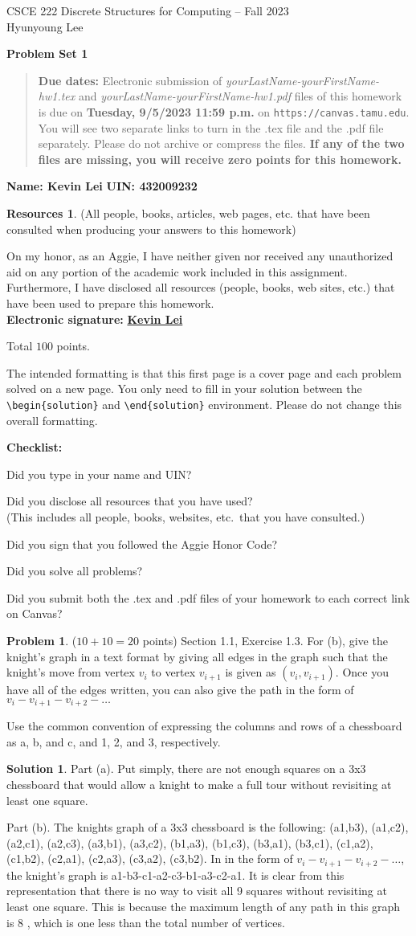 \documentclass{article}
\theoremstyle{definition}
\newtheorem{problem}{Problem}
\newtheorem*{solution}{Solution}
\newtheorem*{resources}{Resources}
\newcommand{\name}[2]{\noindent\textbf{Name: #1}\hfill \textbf{UIN: #2}
  \newcommand{\myName}{#1}
  \newcommand{\myUIN}{#2}
}
\newcommand{\honor}{\noindent On my honor, as an Aggie, I have neither
  given nor received any unauthorized aid on any portion of the
  academic work included in this assignment. Furthermore, I have
  disclosed all resources (people, books, web sites, etc.) that have
  been used to prepare this homework. \\[2ex]
 \textbf{Electronic signature:} \underline{ \textbf{Kevin Lei} } } %
\newcommand{\checklist}{\noindent\textbf{Checklist:}
\begin{compactitem}[$\Box$] 
\item Did you type in your name and UIN? 
\item Did you disclose all resources that you have used? \\
(This includes all people, books, websites, etc.\ that you have consulted.)
\item Did you sign that you followed the Aggie Honor Code? 
\item Did you solve all problems? 
\item Did you submit both the .tex and .pdf files of your homework to each correct link on Canvas? 
\end{compactitem}
}
\newcommand{\problemset}[1]{\begin{center}\textbf{Problem Set #1}\end{center}}
\newcommand{\duedate}[1]{\begin{quote}\textbf{Due dates:} Electronic
    submission of \textsl{yourLastName-yourFirstName-hw1.tex} and 
    \textsl{yourLastName-yourFirstName-hw1.pdf} files of this homework is due on
    \textbf{#1} on \texttt{https://canvas.tamu.edu}. You will see two separate links
    to turn in the .tex file and the .pdf file separately. Please do not archive or compress the files.  
    \textbf{If any of the two files are missing, you will receive zero points for this homework.}\end{quote} }
\begin{document}
\begin{center}
{\large
CSCE 222 Discrete Structures for Computing -- Fall 2023\\[.5ex]
Hyunyoung Lee\\}
\end{center}
\problemset{1}
\duedate{Tuesday, 9/5/2023 11:59 p.m.}
\name{ Kevin Lei }{ 432009232 }  %

\begin{resources} (All people, books, articles, web pages, etc. that
  have been consulted when producing your answers to this homework)
\end{resources}
\honor

\bigskip

\noindent
Total $100$ points.

\bigskip

\noindent
The intended formatting is that this first page is a cover page and each 
problem solved on a new page. You only need to fill in your solution between 
the \verb|\begin{solution}| and \verb|\end{solution}| environment.  
Please do not change this overall formatting.

\vfill
\checklist

\newpage
\begin{problem} ($10+10=20$ points) Section 1.1, Exercise 1.3.
For (b), give the knight's graph in a text format by giving all
edges in the graph such that the knight's move from vertex $v_i$ to 
vertex $v_{i+1}$ is given as $(v_i, v_{i+1})$.  Once you have all of the
edges written, you can also give the path in the form of 
$v_i - v_{i+1} - v_{i+2} - \ldots$

Use the common convention of expressing the columns and rows of
a chessboard as a, b, and c, and 1, 2, and 3, respectively.
\end{problem}
\begin{solution}

Part (a). Put simply, there are not enough squares on a 3x3 chessboard that would allow a knight to make a full tour without revisiting at least one square.

Part (b). The knights graph of a 3x3 chessboard is the following: (a1,b3), (a1,c2), (a2,c1), (a2,c3), (a3,b1), (a3,c2), (b1,a3), (b1,c3), (b3,a1), (b3,c1), (c1,a2), (c1,b2), (c2,a1), (c2,a3), (c3,a2), (c3,b2). 
In in the form of $v_i - v_{i+1} - v_{i+2} - \ldots$, the knight's graph is a1-b3-c1-a2-c3-b1-a3-c2-a1. It is clear from this representation that there is no way to visit all 9 squares without revisiting at least one square. This is because the maximum length of any path in this graph is 8 , which is one less than the total number of vertices.

\end{solution}
\end{document}
